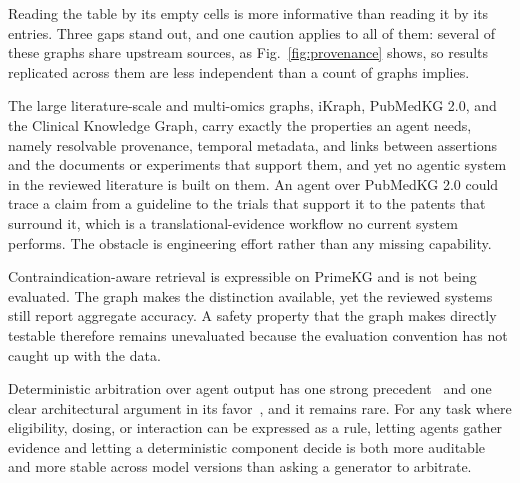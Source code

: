 Reading the table by its empty cells is more informative than reading it by its entries. Three gaps stand out, and one caution applies to all of them: several of these graphs share upstream sources, as Fig.~\ref{fig:provenance} shows, so results replicated across them are less independent than a count of graphs implies.



The large literature-scale and multi-omics graphs, iKraph, PubMedKG 2.0, and the Clinical Knowledge Graph, carry exactly the properties an agent needs, namely resolvable provenance, temporal metadata, and links between assertions and the documents or experiments that support them, and yet no agentic system in the reviewed literature is built on them. An agent over PubMedKG 2.0 could trace a claim from a guideline to the trials that support it to the patents that surround it, which is a translational-evidence workflow no current system performs. The obstacle is engineering effort rather than any missing capability.

Contraindication-aware retrieval is expressible on PrimeKG and is not being evaluated. The graph makes the distinction available, yet the reviewed systems still report aggregate accuracy. A safety property that the graph makes directly testable therefore remains unevaluated because the evaluation convention has not caught up with the data.

Deterministic arbitration over agent output has one strong precedent~\cite{loaizabonilla2026trialmatch} and one clear architectural argument in its favor~\cite{wang2026crossddi}, and it remains rare. For any task where eligibility, dosing, or interaction can be expressed as a rule, letting agents gather evidence and letting a deterministic component decide is both more auditable and more stable across model versions than asking a generator to arbitrate.



